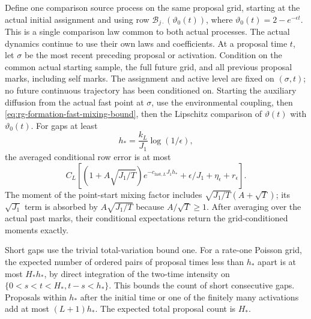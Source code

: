 Define one comparison source process on the same proposal grid,
starting at the actual initial assignment and using row
$\mathcal B_{j\cdot}(\vartheta_0(t))$, where
$\vartheta_0(t)=2-e^{-\epsilon t}$.
This is a single comparison law common to both actual processes.
The actual dynamics continue to use their own laws and coefficients.
At a proposal time $t$, let $\sigma$ be the most recent preceding
proposal or activation. Condition on the common actual starting
sample, the full future grid, and all previous proposal marks,
including self marks. The assignment and active level are fixed on
$(\sigma,t)$; no future continuous trajectory has been conditioned
on. Starting the auxiliary diffusion from the actual fast point at
$\sigma$, use the environmental coupling, then
\cref{eq:rg-formation-fast-mixing-bound}, then the Lipschitz
comparison of $\vartheta(t)$ with $\vartheta_0(t)$.
For gaps at least
\begin{equation}
 h_*=\frac{k_L}{J_1}\log(1/\epsilon),
 \label{eq:rg-formation-history-gap}
\end{equation}
the averaged conditional row error is at most
\begin{equation}
 C_L\left[
 (1+A\sqrt{J_1/T})e^{-c_{\mathrm{fast},L}J_1h_*}
       +\epsilon/J_1+\eta_\epsilon+r_\epsilon\right].
 \label{eq:rg-formation-long-gap-row-error}
\end{equation}
The moment of the point-start mixing factor includes
$\sqrt{J_1/T}(A+\sqrt T)$; its $\sqrt{J_1}$ term is absorbed by
$A\sqrt{J_1/T}$ because $A/\sqrt T\ge1$.
After averaging over the actual past marks, their conditional
expectations return the grid-conditioned moments exactly.

Short gaps use the trivial total-variation bound one.
For a rate-one Poisson grid, the expected number of ordered pairs
of proposal times less than $h_*$ apart is at most $H_*h_*$,
by direct integration of the two-time intensity on
$\{0<s<t<H_*, t-s<h_*\}$. This bounds the count of short
consecutive gaps. Proposals within $h_*$ after the initial time or
one of the finitely many activations add at most $(L+1)h_*$.
The expected total proposal count is $H_*$.

